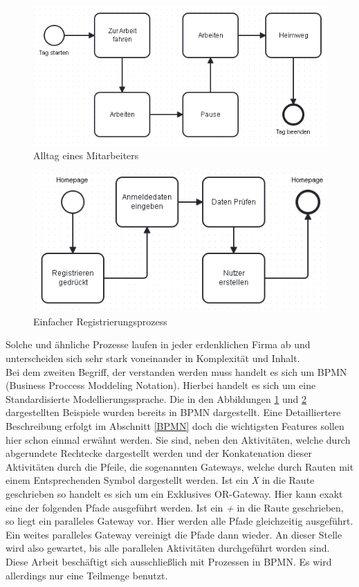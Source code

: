\begin{figure}
\centering
\includegraphics[scale=0.7]{Figures/Einleitungbsp1}
\decoRule
\caption[Alltag eines Mitarbeiters]{Alltag eines Mitarbeiters}
\label{Alltag}
\end{figure}\begin{figure}
\centering
\includegraphics[scale=0.7]{Figures/Einleitungbsp2}
\decoRule
\caption[Einfacher Registrierungsprozess]{Einfacher Registrierungsprozess}
\label{ersteReg}
\end{figure}Solche und ähnliche Prozesse laufen in jeder erdenklichen Firma ab und unterscheiden sich sehr stark voneinander in Komplexität und Inhalt.\\
Bei dem zweiten Begriff, der verstanden werden muss handelt es sich um BPMN (Business Proccess Moddeling Notation). Hierbei handelt es sich um eine Standardisierte Modellierungssprache. Die in den Abbildungen \ref{Alltag} und  \ref{ersteReg} dargestellten Beispiele wurden bereits in BPMN dargestellt. Eine Detailliertere Beschreibung erfolgt im Abschnitt \ref{BPMN} doch die wichtigsten Features sollen hier schon einmal erwähnt werden. Sie sind, neben den Aktivitäten, welche durch abgerundete Rechtecke dargestellt werden und der Konkatenation dieser Aktivitäten durch die Pfeile, die sogenannten Gateways, welche durch Rauten mit einem Entsprechenden Symbol dargestellt werden. Ist ein \textit{X} in die Raute geschrieben so handelt es sich um ein Exklusives OR-Gateway. Hier kann exakt eine der folgenden Pfade ausgeführt werden. Ist ein \textit{+} in die Raute geschrieben, so liegt ein paralleles Gateway vor. Hier werden alle Pfade gleichzeitig ausgeführt. Ein weites paralleles Gateway vereinigt die Pfade dann wieder. An dieser Stelle wird also gewartet, bis alle parallelen Aktivitäten durchgeführt worden sind. Diese Arbeit beschäftigt sich ausschließlich mit Prozessen in BPMN. Es wird allerdings nur eine Teilmenge benutzt.\\
